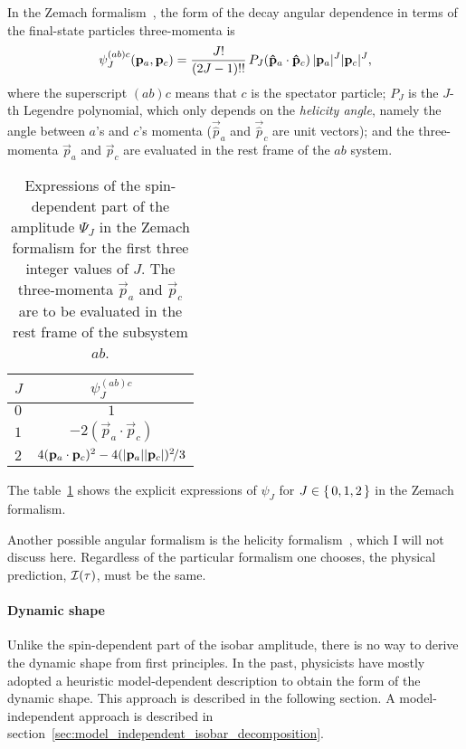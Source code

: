     In the Zemach formalism~\cite[\S~V.1]{PhysRev.140.B97}, the form of the decay angular dependence in terms of the final-state particles three-momenta is
    \begin{equation}\label{eq:zemach_formalism}
        \psi_{J}^{(ab)c}(\mathbf{{p}}_a,\mathbf{{p}}_c) = \frac{J!}{(2J-1)!!}\,P_J(\mathbf{{\hat{p}}}_a \cdot \mathbf{{\hat{p}}}_c)\,\lvert\mathbf{{p}}_a\rvert^J\lvert\mathbf{{p}}_c\rvert^J,
    \end{equation}
    where the superscript $(ab)c$ means that $c$ is the spectator particle;
    $P_J$ is the $J$-th Legendre polynomial, which only depends on the \emph{helicity angle}, namely the angle between $a$'s and $c$'s momenta ($\vec{\hat{p}}_a$ and $\vec{\hat{p}}_c$ are unit vectors);
    and the three-momenta $\vec{p}_a$ and $\vec{p}_c$ are evaluated in the rest frame of the $ab$ system.
    \begin{table}
        \centering
        \caption{Expressions of the spin-dependent part of the amplitude $\Psi_J$ in the Zemach formalism for the first three integer values of $J$.
                 The three-momenta $\vec{p}_a$ and $\vec{p}_c$ are to be evaluated in the rest frame of the subsystem $ab$.}
        \label{tab:zemach_formalism}
        
        \begin{tabular}{lc}
            \toprule
            $J$ &$\psi_J^{(ab)c}$\\
            \midrule
            $0$ &$1$ \\
            $1$ &$-2(\vec{p}_a\cdot\vec{p}_c)$ \\
            $2$ &$4(\mathbf{{p}}_a\cdot\mathbf{{p}}_c)^2 - 4(\lvert\mathbf{{p}}_a\rvert\lvert\mathbf{{p}}_c\rvert)^2\!/3$\\
            \bottomrule
        \end{tabular}
    \end{table}
    The table~\ref{tab:zemach_formalism} shows the explicit expressions of $\psi_J$ for $J\in\set{0,1,2}$ in the Zemach formalism.


    Another possible angular formalism is the helicity formalism~\cite{jacob1959404}, which I will not discuss here.
    Regardless of the particular formalism one chooses, the physical prediction, $\mathcal{I}(\tau)$, must be the same.

    \paragraph{Dynamic shape}
    Unlike the spin-dependent part of the isobar amplitude, there is no way to derive the dynamic shape from first principles.
    In the past, physicists have mostly adopted a heuristic model-dependent description to obtain the form of the dynamic shape.
    This approach is described in the following section.
    A model-independent approach is described in section~\ref{sec:model_independent_isobar_decomposition}.


    
    
